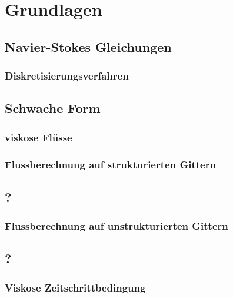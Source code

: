 \documentclass[
	11pt, %
	aspectratio=169, %
]{beamer}
\begin{document}
\section{Grundlagen} %

\subsection{Navier-Stokes Gleichungen}

\begin{frame}

	\frametitle{Diskretisierungsverfahren}
	


\end{frame}

\subsection{Schwache Form}

\begin{frame}

	\frametitle{viskose Flüsse}

\end{frame}



\begin{frame}
	\frametitle{Flussberechnung auf strukturierten Gittern}

\end{frame}


\subsection{?}

\begin{frame}
	\frametitle{Flussberechnung auf unstrukturierten Gittern}
	

\end{frame}	

\subsection{?}
\begin{frame}
	\frametitle{Viskose Zeitschrittbedingung}

\end{frame}
\end{document}
